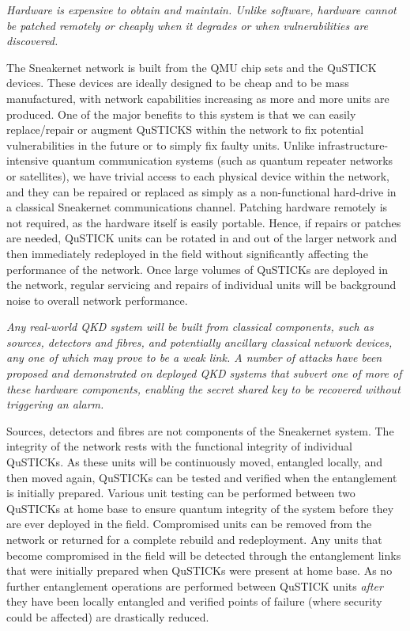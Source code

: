 \documentclass[twocolumn, aps, rmp, amsmath, amssymb, nofootinbib, superscriptaddress, longbibliography, floatfix, table-of-contents, eqsecnum]{revtex4-2}
\begin{document}
{\em Hardware is expensive to obtain and maintain. Unlike software, hardware cannot be patched remotely or cheaply when it degrades or when vulnerabilities are discovered.}

The Sneakernet network is built from the QMU chip sets and the QuSTICK devices. These devices are ideally designed to be cheap and to be mass manufactured, with network capabilities increasing as more and more units are produced. One of the major benefits to this system is that we can easily replace/repair or augment QuSTICKS within the network to fix potential vulnerabilities in the future or to simply fix faulty units. Unlike infrastructure-intensive quantum communication systems (such as quantum repeater networks or satellites), we have trivial access to each physical device within the network, and they can be repaired or replaced as simply as a non-functional hard-drive in a classical Sneakernet communications channel. Patching hardware remotely is not required, as the hardware itself is easily portable. Hence, if repairs or patches are needed, QuSTICK units can be rotated in and out of the larger network and then immediately redeployed in the field without significantly affecting the performance of the network. Once large volumes of QuSTICKs are deployed in the network, regular servicing and repairs of individual units will be background noise to overall network performance. 

\textit{Any real-world QKD system will be built from classical components, such as sources, detectors and fibres, and potentially ancillary classical network devices, any one of which may prove to be a weak link. A number of attacks have been proposed and demonstrated on deployed QKD systems that subvert one of more of these hardware components, enabling the secret shared key to be recovered without triggering an alarm.}

Sources, detectors and fibres are not components of the Sneakernet system. The integrity of the network rests with the functional integrity of individual QuSTICKs. As these units will be continuously moved, entangled locally, and then moved again, QuSTICKs can be tested and verified when the entanglement is initially prepared. Various unit testing can be performed between two QuSTICKs at home base to ensure quantum integrity of the system before they are ever deployed in the field. Compromised units can be removed from the network or returned for a complete rebuild and redeployment. Any units that become compromised in the field will be detected through the entanglement links that were initially prepared when QuSTICKs were present at home base. As no further entanglement operations are performed between QuSTICK units \textit{after} they have been locally entangled and verified points of failure (where security could be affected) are drastically reduced. 
\end{document}

